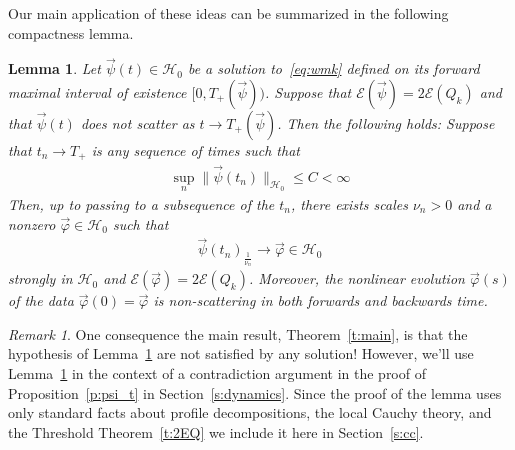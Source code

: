 \documentclass[10pt,reqno]{amsart}
\newcommand{\E}{\mathcal{E}}
\newcommand{\HH}{\mathcal{H}}
\newcommand{\fy}{\varphi}
\newcommand{\EQ}[1]{\begin{equation}\begin{split} #1 \end{split}\end{equation}}
\numberwithin{equation}{section}
\newtheorem{lem}[thm]{Lemma}
\theoremstyle{remark}
\newtheorem{rem}[thm]{Remark}
\newcommand{\0}{\emptyset}
\begin{document}
Our main application of these ideas can be summarized in the following compactness lemma. 
 
 
  \begin{lem} \label{l:1profile} Let $\vec \psi(t) \in \HH_0$ be a solution to~\eqref{eq:wmk} defined on its forward maximal interval of existence $[0, T_+(\vec \psi))$. Suppose that $\E(\vec \psi) = 2 \E(Q_k)$ and that $\vec \psi(t)$ does not scatter as $t \to T_+(\vec \psi)$. Then the following holds: Suppose that  $t_n \to T_+ $ is any sequence of times such that 
  \EQ{ \label{eq:Hbounded} 
  \sup_n \| \vec\psi(t_n)\|_{\HH_0} \le C < \infty
  }
  Then, up to passing to a subsequence of the $t_n$, there exists scales $\nu_n>0$ and a nonzero $\vec \fy \in \HH_0$ such that 
  \EQ{
   \vec \psi(t_n)_{\frac{1}{\nu_n}} \to \vec \fy \in \HH_0
  }
  strongly in $\HH_0$ and $ \E(\vec \fy ) = 2\E(Q_k)$. Moreover, the nonlinear evolution $\vec \fy(s)$ of the data $\vec \fy(0) = \vec \fy$   is non-scattering in both forwards and backwards time. 
 \end{lem} 
 
 \begin{rem}
One consequence the main result,  Theorem~\ref{t:main}, is that the hypothesis of Lemma~\ref{l:1profile} are not satisfied by any solution! However, we'll use Lemma~\ref{l:1profile} in the context of a contradiction argument in the proof of Proposition~\ref{p:psi_t} in Section~\ref{s:dynamics}. Since the proof of the lemma uses only standard facts about profile decompositions, the local Cauchy theory, and the Threshold Theorem~\ref{t:2EQ} we include it here in Section~\ref{s:cc}. 
 \end{rem} 
 
\end{document}
